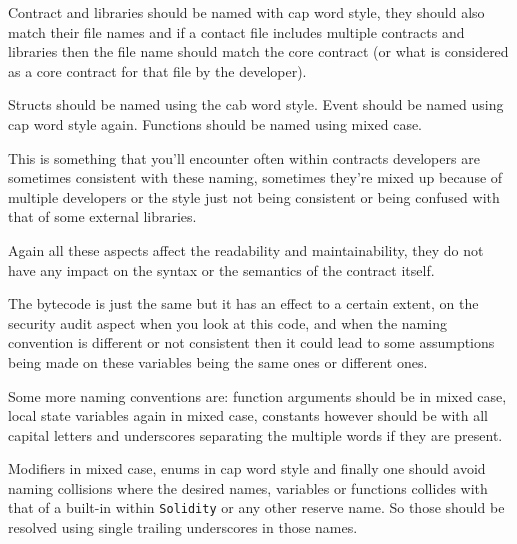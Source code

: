 Contract and libraries should be named with cap word style, they should
also match their file names and if a contact file includes multiple
contracts and libraries then the file name should match the core
contract (or what is considered as a core contract for that file by the
developer).

Structs should be named using the cab word style. Event should be named
using cap word style again. Functions should be named using mixed case.

This is something that you'll encounter often within contracts
developers are sometimes consistent with these naming, sometimes they're
mixed up because of multiple developers or the style just not being
consistent or being confused with that of some external libraries.

Again all these aspects affect the readability and maintainability, they
do not have any impact on the syntax or the semantics of the contract
itself.

The bytecode is just the same but it has an effect to a certain extent,
on the security audit aspect when you look at this code, and when the
naming convention is different or not consistent then it could lead to
some assumptions being made on these variables being the same ones or
different ones.

Some more naming conventions are: function arguments should be in mixed
case, local state variables again in mixed case, constants however
should be with all capital letters and underscores separating the
multiple words if they are present.

Modifiers in mixed case, enums in cap word style and finally one should
avoid naming collisions where the desired names, variables or functions
collides with that of a built-in within \texttt{Solidity} or any other
reserve name. So those should be resolved using single trailing
underscores in those names.
